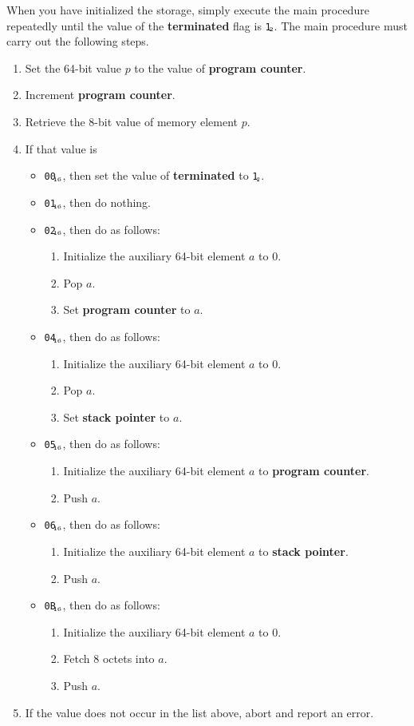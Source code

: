 \documentclass[a4paper,12pt]{article}
\newcommand{\num}[1]{\texttt{#1}\xspace}
\newcommand{\hex}[1]{\num{#1}$_{\textup{\tiny\hskip-1ex 16}}$\xspace}
\newcommand{\bin}[1]{\num{#1}$_{\textup{\tiny\hskip-1ex 2}}$\xspace}
\newcommand{\PC}{\textbf{program counter}\xspace}
\newcommand{\SP}{\textbf{stack pointer}\xspace}
\newcommand{\TERM}{\textbf{terminated}\xspace}
\newcommand{\T}{\bin{1}}
\newcommand{\op}[1]{#1}
\newcommand{\EXIT}      [1]{\op{\hex{00}}}
\newcommand{\NOP}       [1]{\op{\hex{01}}}
\newcommand{\JUMP}      [1]{\op{\hex{02}}}
\newcommand{\SETSP}     [1]{\op{\hex{04}}}
\newcommand{\GETPC}     [1]{\op{\hex{05}}}
\newcommand{\GETSP}     [1]{\op{\hex{06}}}
\newcommand{\PUSHL}     [1]{\op{\hex{0B}}}
\begin{document}
When you have initialized the storage, simply execute the main procedure repeatedly until the value of the \TERM flag is \T.
The main procedure must carry out the following steps.
\begin{enumerate}
\item Set the 64-bit value $p$ to the value of \PC.
\item Increment \PC.
\item Retrieve the 8-bit value of memory element $p$.
\item\label{itm:main-case} If that value is
  \begin{itemize}
  \item \EXIT{}, then set the value of \TERM to \T.
  \item \NOP{}, then do nothing.
  \item \JUMP{}, then do as follows:
    \begin{enumerate}
    \item Initialize the auxiliary 64-bit element $a$ to 0.
    \item Pop $a$.
    \item Set \PC to $a$.
    \end{enumerate}
  \item \SETSP{}, then do as follows:
    \begin{enumerate}
    \item Initialize the auxiliary 64-bit element $a$ to 0.
    \item Pop $a$.
    \item Set \SP to $a$.
    \end{enumerate}
  \item \GETPC{}, then do as follows:
    \begin{enumerate}
    \item Initialize the auxiliary 64-bit element $a$ to \PC.
    \item Push $a$.
    \end{enumerate}
  \item \GETSP{}, then do as follows:
    \begin{enumerate}
    \item Initialize the auxiliary 64-bit element $a$ to \SP.
    \item Push $a$.
    \end{enumerate}
  \item \PUSHL{}, then do as follows:
    \begin{enumerate}
    \item Initialize the auxiliary 64-bit element $a$ to 0.
    \item Fetch 8 octets into $a$.
    \item Push $a$.
    \end{enumerate}
  \end{itemize}
\item If the value does not occur in the list above, abort and report an error.
\end{enumerate}
\end{document}
